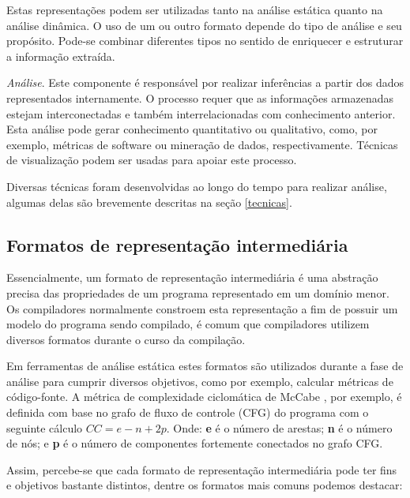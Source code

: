 \begin{description}
    Estas representações podem ser utilizadas tanto na análise estática quanto
    na análise dinâmica. O uso de um ou outro formato depende do tipo de
    análise e seu propósito. Pode-se combinar diferentes tipos no sentido de
    enriquecer e estruturar a informação extraída.

  \item \textit{Análise}.
    Este componente é responsável por realizar inferências a partir dos dados
    representados internamente. O processo requer que as informações
    armazenadas estejam interconectadas e também interrelacionadas com
    conhecimento anterior. Esta análise pode gerar conhecimento quantitativo
    ou qualitativo, como, por exemplo, métricas de software ou mineração de
    dados, respectivamente. Técnicas de visualização podem ser usadas para
    apoiar este processo.

    Diversas técnicas foram desenvolvidas ao longo do tempo para realizar
    análise, algumas delas são brevemente descritas na seção \ref{tecnicas}.

\end{description}

\subsection{Formatos de representação intermediária} \label{formatos}

Essencialmente, um formato de representação intermediária é uma abstração precisa
das propriedades de um programa representado em um domínio menor. Os
compiladores normalmente constroem esta representação a fim de possuir um
modelo do programa sendo compilado, é comum que compiladores utilizem diversos
formatos durante o curso da compilação.

Em ferramentas de análise estática estes formatos são utilizados durante a
fase de análise para cumprir diversos objetivos, como por exemplo, calcular
métricas de código-fonte. A métrica de complexidade ciclomática de McCabe
\cite{McCabe1976}, por exemplo, é definida com base no grafo de fluxo de controle (CFG) do
programa com o seguinte cálculo $CC = e - n + 2p$. Onde: {\bf e} é o número de
arestas; {\bf n} é o número de nós; e {\bf p} é o número de componentes
fortemente conectados no grafo CFG.

Assim, percebe-se que cada formato de representação intermediária \cite{Nielson2015, Stanier2013, Cruz2009, Ramalho1996} pode ter fins e
objetivos bastante distintos, dentre os formatos mais comuns podemos destacar:

